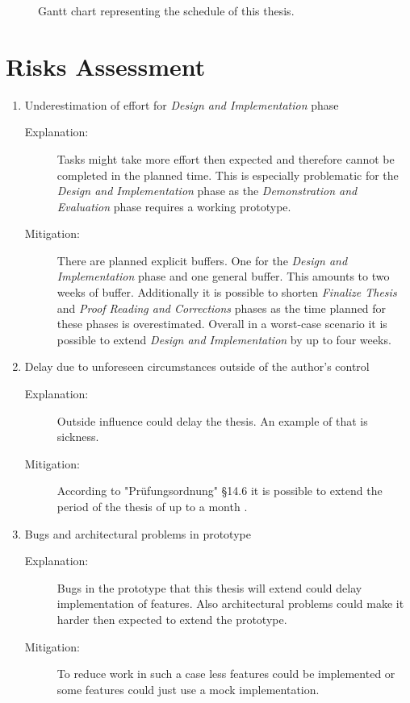 \begin{figure}
\begin{center}
\begin{ganttchart}
        \end{ganttchart}
    \end{center}
    \caption{Gantt chart representing the schedule of this thesis.
    }
    \label{fig:Organisation:Schedule:Gant}
\end{figure}

\section{Risks Assessment}
\label{sec:Organisation:RiskAssessment}

\begin{enumerate}[label=Risk \arabic*:, align=left, leftmargin=*]
    \item Underestimation of effort for \emph{Design and Implementation} phase
        \begin{description}
            \item[Explanation:] Tasks might take more effort then expected and therefore cannot be completed in the planned time. This is especially problematic for the \emph{Design and Implementation} phase as the \emph{Demonstration and Evaluation} phase requires  a working prototype.
            \item[Mitigation:] There are planned explicit buffers. One for the \emph{Design and Implementation} phase and one general buffer. This amounts to two weeks of buffer. Additionally it is possible to shorten \emph{Finalize Thesis} and \emph{Proof Reading and Corrections} phases as the time planned for these phases is overestimated. Overall in a worst-case scenario it is possible to extend \emph{Design and Implementation} by up to four weeks.
        \end{description}
    \pagebreak[3]    
    \item Delay due to unforeseen circumstances outside of the author's control
        \begin{description}
            \item[Explanation:] Outside influence could delay the thesis. An example of that is sickness.
            \item[Mitigation:] According to "Prüfungsordnung" §14.6 it is possible to extend the period of the thesis of up to a month \cite[~ p. 724]{StudienUndPrufungsordnung2015}.
        \end{description}
    \pagebreak[3]
    \item Bugs and architectural problems in prototype
        \begin{description}
            \item[Explanation:] Bugs in the prototype that this thesis will extend could delay implementation of features. Also architectural problems could make it harder then expected to extend the prototype.
            \item[Mitigation:] To reduce work in such a case less features could be implemented or some features could just use a mock implementation.
        \end{description}
    \pagebreak[3]
\end{enumerate}